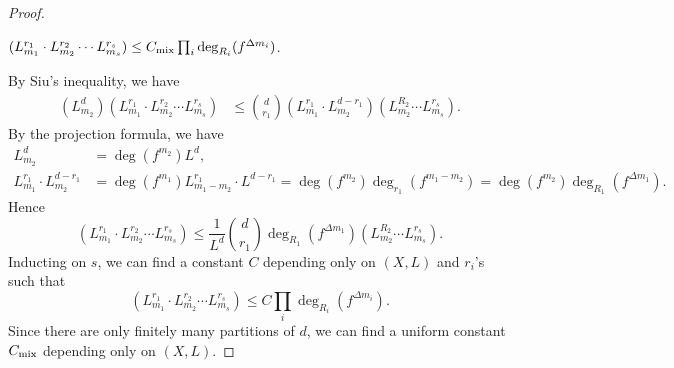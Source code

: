 \begin{proof}
	\hspace{1em}
	\begin{step}\label{step1_in_proof_of_estimation_of_mixed_degrees}
		$(L_{m_1}^{r_1} \cdot L_{m_2}^{r_2} \cdots L_{m_s}^{r_s}) \leq C_{\text{mix}} \prod_i \deg_{R_i}(f^{\Delta m_i})$.
	\end{step}
	By Siu's inequality, we have
	\begin{align*}
		(L_{m_2}^{d}) (L_{m_1}^{r_1} \cdot L_{m_2}^{r_2} \cdots L_{m_s}^{r_s}) & \leq \binom{d}{r_1} (L_{m_1}^{r_1} \cdot L_{m_2}^{d-r_1}) (L_{m_2}^{R_2} \cdots L_{m_s}^{r_s}).
	\end{align*}
	By the projection formula, we have
	\begin{align*}
		L_{m_2}^d                           & = \deg(f^{m_2}) L^d,                                                                                                                    \\
		L_{m_1}^{r_1} \cdot L_{m_2}^{d-r_1} & = \deg(f^{m_1}) L^{r_1}_{m_1-m_2} \cdot L^{d-r_1} = \deg(f^{m_2}) \deg_{r_1}(f^{m_1 - m_2}) = \deg(f^{m_2}) \deg_{R_1}(f^{\Delta m_1}).
	\end{align*}
	Hence
	\[ (L_{m_1}^{r_1} \cdot L_{m_2}^{r_2} \cdots L_{m_s}^{r_s}) \leq \frac{1}{L^d} \binom{d}{r_1} \deg_{R_1}(f^{\Delta m_1}) (L_{m_2}^{R_2} \cdots L_{m_s}^{r_s}). \]
	Inducting on $s$, we can find a constant $C$ depending only on $(X,L)$ and $r_i$'s such that
	\[ (L_{m_1}^{r_1} \cdot L_{m_2}^{r_2} \cdots L_{m_s}^{r_s}) \leq C \prod_i \deg_{R_i}(f^{\Delta m_i}). \]
	Since there are only finitely many partitions of $d$, we can find a uniform constant $C_{\text{mix}}$ depending only on $(X,L)$.



\end{proof}
